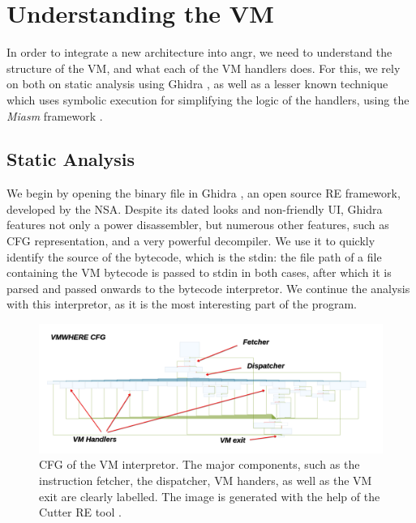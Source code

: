 \section{Understanding the VM}

In order to integrate a new architecture into angr, we need to understand the structure of the \gls{VM}, and what each of the \gls{VM} handlers does. For this, we rely on both on static analysis using Ghidra \cite{ghidra}, as well as a lesser known technique which uses symbolic execution for simplifying the logic of the handlers, using the \emph{Miasm} framework \cite{miasm}. %

\subsection{Static Analysis}
\label{static_ghidra}

We begin by opening the binary file in Ghidra \cite{ghidra}, an open source \gls{RE} framework, developed by the \gls{NSA}. Despite its dated looks and non-friendly \gls{UI}, Ghidra features not only a power disassembler, but numerous other features, such as \gls{CFG} representation, and a very powerful decompiler. We use it to quickly identify the source of the bytecode, which is the \gls{stdin}: the file path of a file containing the \gls{VM} bytecode is passed to \gls{stdin} in both cases, after which it is parsed and passed onwards to the bytecode interpretor. We continue the analysis with this interpretor, as it is the most interesting part of the program.

\begin{figure}[h]
    \centering
    \includegraphics[width=\textwidth]{./images/cfg_vmwhere}
    \caption{\gls{CFG} of the  \gls{VM} interpretor. The major components, such as the instruction fetcher, the dispatcher, \gls{VM} handers, as well as the \gls{VM} exit are clearly labelled. The image is generated with the help of the Cutter \gls{RE} tool \cite{cutter}.}
    \label{fig:cfg_vmwhere}
\end{figure}

